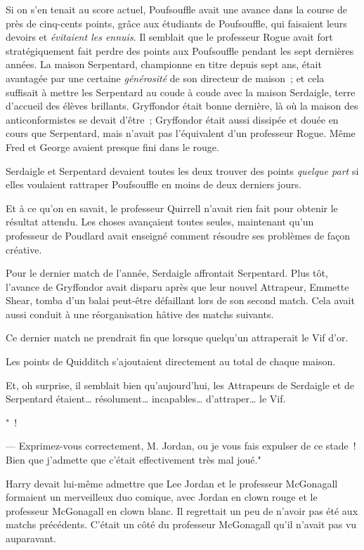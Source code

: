 Si on s'en tenait au score actuel, Poufsouffle avait une avance dans la course de près de cinq-cents points, grâce aux étudiants de Poufsouffle, qui faisaient leurs devoirs et \emph{évitaient les ennuis}. Il semblait que le professeur Rogue avait fort stratégiquement fait perdre des points aux Poufsouffle pendant les sept dernières années. La maison Serpentard, championne en titre depuis sept ans, était avantagée par une certaine \emph{générosité} de son directeur de maison~; et cela suffisait à mettre les Serpentard au coude à coude avec la maison Serdaigle, terre d'accueil des élèves brillants. Gryffondor était bonne dernière, là où la maison des anticonformistes se devait d'être~; Gryffondor était aussi dissipée et douée en cours que Serpentard, mais n'avait pas l'équivalent d'un professeur Rogue. Même Fred et George avaient presque fini dans le rouge.

Serdaigle et Serpentard devaient toutes les deux trouver des points \emph{quelque part} si elles voulaient rattraper Poufsouffle en moins de deux derniers jours.

Et à ce qu'on en savait, le professeur Quirrell n'avait rien fait pour obtenir le résultat attendu. Les choses avançaient toutes seules, maintenant qu'un professeur de Poudlard avait enseigné comment résoudre ses problèmes de façon créative.

Pour le dernier match de l'année, Serdaigle affrontait Serpentard. Plus tôt, l'avance de Gryffondor avait disparu après que leur nouvel Attrapeur, Emmette Shear, tomba d'un balai peut-être défaillant lors de son second match. Cela avait aussi conduit à une réorganisation hâtive des matchs suivants.

Ce dernier match ne prendrait fin que lorsque quelqu'un attraperait le Vif d'or.

Les points de Quidditch s'ajoutaient directement au total de chaque maison.

Et, oh surprise, il semblait bien qu'aujourd'hui, les Attrapeurs de Serdaigle et de Serpentard étaient… résolument… incapables… d'attraper… le Vif.

"~!

--- Exprimez-vous correctement, M. Jordan, ou je vous fais expulser de ce stade~! Bien que j'admette que c'était effectivement très mal joué."

Harry devait lui-même admettre que Lee Jordan et le professeur McGonagall formaient un merveilleux duo comique, avec Jordan en clown rouge et le professeur McGonagall en clown blanc. Il regrettait un peu de n'avoir pas été aux matchs précédents. C'était un côté du professeur McGonagall qu'il n'avait pas vu auparavant.

